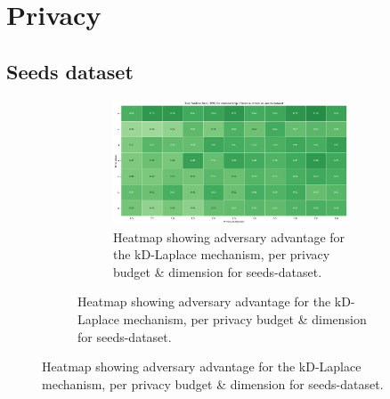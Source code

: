 \section{Privacy}
\subsection{Seeds dataset}
\begin{figure}[H]
    \centering
    \begin{subfigure}[b]{0.85\textwidth}
        \begin{subfigure}[c]{1\textwidth}
            \includegraphics[width=1\textwidth]{Results/kd-laplace/kd-Laplace/seeds-dataset/tpr.png}
            \caption{Heatmap showing adversary advantage for the kD-Laplace mechanism, per privacy budget \& dimension for seeds-dataset.}
            \label{fig:privacy_seeds-dataset_adversial_advantage_kd-laplace}
        \end{subfigure}
        \vfill %


\end{subfigure}
\end{figure}
